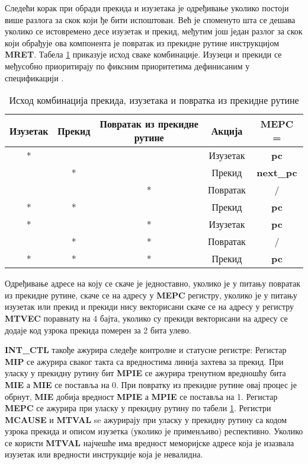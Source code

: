 Следећи корак при обради прекида и изузетака је одређивање уколико постоји више разлога за скок који ђе бити испоштован. Већ је споменуто шта се дешава уколико се истовремено десе изузетак и прекид, међутим још један разлог за скок који обрађује ова компонента је повратак из прекидне рутине инструкцијом \textbf{MRET}. Табела \ref{tab:int} приказује исход сваке комбинације. Изузеци и прекиди се међусобно приоритирају по фиксним приоритетима дефинисаним у спецификацији \cite{priv_spec}.

\begin{table}[h!]
	\centering
	\caption{Исход комбинација прекида, изузетака и повратка из прекидне рутине}
	\label{tab:int}
\begin{tabular}{|c|c|c|c|c|}
	\hline
	Изузетак & Прекид & Повратак из прекидне рутине & Акција & \textbf{\acrshort{MEPC}} = \\
	\hline
	* &  &  & Изузетак & \textbf{pc} \\
	\hline
	& * &  & Прекид & \textbf{next\_pc} \\
	\hline
	&  & * & Повратак & / \\
	\hline
	* & * &  & Прекид & \textbf{pc} \\
	\hline
	* &  & * & Изузетак & \textbf{pc} \\
	\hline
	& * & * & Повратак & / \\
	\hline
	* & * & * & Прекид & \textbf{pc} \\
	\hline
\end{tabular}
\end{table}\newpage

Одређивање адресе на коју се скаче је једноставно, уколико је у питању повратак из прекидне рутине, скаче се на адресу у \textbf{\acrshort{MEPC}} регистру, уколико је у питању изузетак или прекид и прекиди нису векторисани скаче се на адресу у регистру \textbf{MTVEC} поравнату на 4 бајта, уколико су прекиди векторисани на адресу се додаје код узрока прекида померен за 2 бита улево.

\textbf{INT\_CTL} такође ажурира следеђе контролне и статусне регистре:
Регистар \textbf{\acrshort{MIP}} се ажурира сваког такта са вредностима линија захтева за прекид.
При уласку у прекидну рутину бит \textbf{\acrshort{MPIE}} се ажурира тренутном вредношћу бита \textbf{\acrshort{MIE}} а \textbf{\acrshort{MIE}} се поставља на 0.
При повратку из прекидне рутине овај процес је обрнут, \textbf{\acrshort{MIE}} добија вредност \textbf{\acrshort{MPIE}} а \textbf{\acrshort{MPIE}} се поставља на 1.
Регистар \textbf{\acrshort{MEPC}} се ажурира при уласку у прекидну рутину по табели \ref{tab:int}.
Регистри \textbf{\acrshort{MCAUSE}} и \textbf{\acrshort{MTVAL}} se ажурирају при уласку у прекидну рутину са кодом узрока прекида и описом изузетка (уколико је применљиво) респективно.
Уколико се користи \textbf{\acrshort{MTVAL}} најчешће има вредност меморијске адресе која је изазвала изузетак или вредности инструкције која је невалидна.